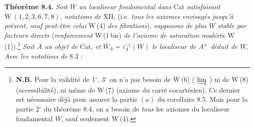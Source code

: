 \textbf{Théorème 8.4.} \textit{Soit $W$ un localiseur fondamental dans} Cat \textit{satisfaisant} $\mathrm{W}\,(1,2,3,6,7,8)$, \textit{notations de} XII, (i.e. \textit{tous les axiomes envisagés jusqu'à présent, sauf peut-être celui} W\,(4) \textit{des fibrations}), \textit{supposons de plus $W$ stable par facteurs directs} (\textit{renforcement} W\,(1\,bis) \textit{de l'axiome de saturation modérée} W\,(1)).\footnote[37]{\textbf{N.B.} Pour la validité de 1$^\circ$, 3$^\circ$ on n'a pas besoin de W\,(6) ( $\varinjlim$ ) ni de W\,(8) (accessibilité), ni même de W\,(7) (axiome du carré cocartésien). Ce dernier est nécessaire déjà pour assurer la partie $(a)$ du corollaire 8.5. Mais pour la partie 2$^\circ$ du théorème 8.4, on a besoin de \textit{tous} les axiomes du localiseur fondamental $W$, sauf seulement W\,(4).} \textit{Soit $A$ un objet de} Cat, \textit{et $W_A=i_A^{-1}(W)$ le localiseur de $A^{\wedge}$ déduit de $W$. Avec les notations de} 8.3 :
